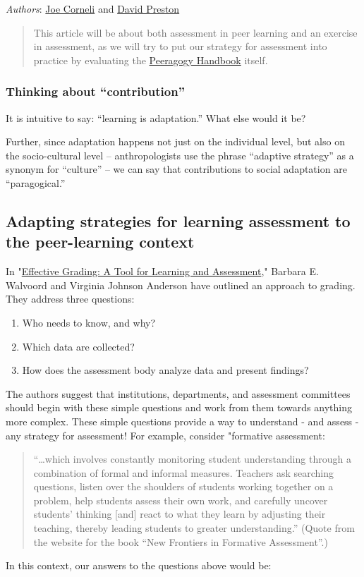 \emph{Authors}: \href{http://peeragogy.org/resources/meet-the-team/}{Joe
Corneli} and \href{http://peeragogy.org/resources/meet-the-team/}{David
Preston}

\begin{quote}
This article will be about both assessment in peer learning and an
exercise in assessment, as we will try to put our strategy for
assessment into practice by evaluating the
\href{http://peeragogy.org}{Peeragogy Handbook} itself.
\end{quote}
\subsubsection{Thinking about ``contribution''}

It is intuitive to say: ``learning is adaptation.'' What else would it
be?

Further, since adaptation happens not just on the individual level, but
also on the socio-cultural level -- anthropologists use the phrase
``adaptive strategy'' as a synonym for ``culture'' -- we can say that
contributions to social adaptation are ``paragogical.''

\subsection{Adapting strategies for learning assessment to the
peer-learning context}

In
"\href{http://books.google.com/books?id=EJxy06yX\_NoC\&printsec=frontcover\&source=gbs\_atb\#v=onepage\&q\&f=false}{Effective
Grading: A Tool for Learning and Assessment}," Barbara E. Walvoord and
Virginia Johnson Anderson have outlined an approach to grading. They
address three questions:

\begin{enumerate}
\item
  Who needs to know, and why?
\item
  Which data are collected?
\item
  How does the assessment body analyze data and present findings?
\end{enumerate}
The authors suggest that institutions, departments, and assessment
committees should begin with these simple questions and work from them
towards anything more complex. These simple questions provide a way to
understand - and assess - any strategy for assessment! For example,
consider "formative assessment:

\begin{quote}
``\ldots{}which involves constantly monitoring student understanding
through a combination of formal and informal measures. Teachers ask
searching questions, listen over the shoulders of students working
together on a problem, help students assess their own work, and
carefully uncover students' thinking {[}and{]} react to what they learn
by adjusting their teaching, thereby leading students to greater
understanding.'' (Quote from the website for the book ``New Frontiers in
Formative Assessment''.)

\end{quote}
In this context, our answers to the questions above would be:

